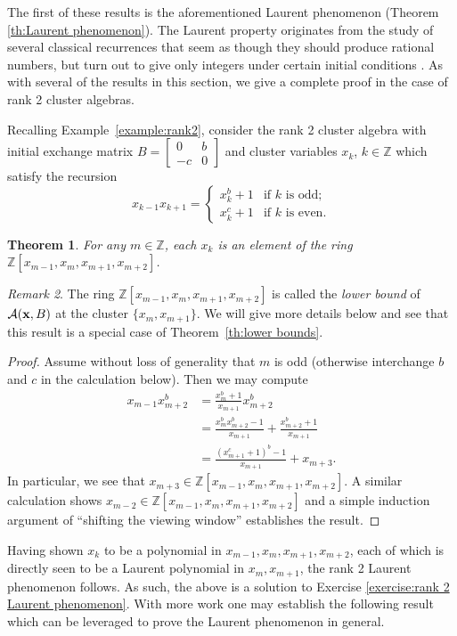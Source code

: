 \documentclass{amsart}
\newtheorem{theorem}{Theorem}[section]
\theoremstyle{definition}
\theoremstyle{remark}
\newtheorem{remark}[theorem]{Remark}
\numberwithin{equation}{section}
\newcommand{\cA}{{\mathcal{A}}}
\newcommand{\bx}{{\bf x}}
\newcommand{\ZZ}{{\mathbb{Z}}}
\begin{document}
  The first of these results is the aforementioned Laurent phenomenon (Theorem \ref{th:Laurent phenomenon}).  The Laurent property originates from the study of several classical recurrences that seem as though they should produce rational numbers, but turn out to give only integers under certain initial conditions \cite{FZ02b}.  As with several of the results in this section, we give a complete proof in the case of rank 2 cluster algebras.
	
	Recalling Example~\ref{example:rank2}, consider the rank 2 cluster algebra with initial exchange matrix $B=\left[\begin{array}{cc}0 & b\\ -c & 0\end{array}\right]$  and cluster variables $x_k$, $k\in\ZZ$ which satisfy the recursion
  \[x_{k-1}x_{k+1}=\begin{cases}x_k^b+1 & \text{if $k$ is odd;}\\ x_k^c+1 & \text{if $k$ is even.}\end{cases}\]
  \begin{theorem}
    For any $m\in\ZZ$, each $x_k$ is an element of the ring $\ZZ[x_{m-1},x_m,x_{m+1},x_{m+2}]$.
  \end{theorem}
  \begin{remark}
    The ring $\ZZ[x_{m-1},x_m,x_{m+1},x_{m+2}]$ is called the \emph{lower bound} of $\cA(\bx,B)$ at the cluster $\{x_m,x_{m+1}\}$.  We will give more details below and see that this result is a special case of Theorem~\ref{th:lower bounds}.
  \end{remark}
  \begin{proof}
		Assume without loss of generality that $m$ is odd (otherwise interchange $b$ and $c$ in the calculation below).  Then we may compute
    \begin{align*}
      x_{m-1}x_{m+2}^b
      &=\frac{x_m^b+1}{x_{m+1}}x_{m+2}^b\\
      &=\frac{x_m^bx_{m+2}^b-1}{x_{m+1}}+\frac{x_{m+2}^b+1}{x_{m+1}}\\
      &=\frac{(x_{m+1}^c+1)^b-1}{x_{m+1}}+x_{m+3}.
    \end{align*}
    In particular, we see that $x_{m+3}\in\ZZ[x_{m-1},x_m,x_{m+1},x_{m+2}]$.  A similar calculation shows $x_{m-2}\in\ZZ[x_{m-1},x_m,x_{m+1},x_{m+2}]$ and a simple induction argument of ``shifting the viewing window'' establishes the result.
  \end{proof}
	Having shown $x_k$ to be a polynomial in $x_{m-1},x_m,x_{m+1},x_{m+2}$, each of which is directly seen to be a Laurent polynomial in $x_m, x_{m+1}$, the rank 2 Laurent phenomenon follows.  As such, the above is a solution to Exercise \ref{exercise:rank 2 Laurent phenomenon}. With more work one may establish the following result which can be leveraged to prove the Laurent phenomenon in general.
\end{document}
